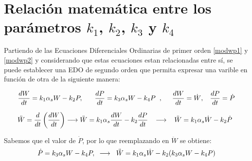 
\section{Relación matemática entre los parámetros $k_{1}$, $k_{2}$, $k_{3}$ y $k_{4}$}\label{demostralabel}

Partiendo de las Ecuaciones Diferenciales Ordinarias de primer orden \ref{modwp1} y \ref{modwp2} y considerando que estas ecuaciones estan relacionadas entre sí, se puede establecer una EDO de segundo orden que permita expresar una varible en función de otra de la siguiente manera:

\begin{equation*}
    \frac{dW}{dt} = k_{1}\alpha_{s}W - k_{2}P, \hspace{0.6cm} \frac{dP}{dt} = k_{3}\alpha_{s}W - k_{4}P \hspace{0.2cm}, \hspace{0.3cm} \hspace{0.2cm} \frac{dW}{dt} = \dot{W}, \hspace{0.3cm} \frac{dP}{dt} = \dot{P}
\end{equation*}


\begin{equation*}
    \ddot{W} = \frac{d}{dt}\left(\frac{dW}{dt}\right) \longrightarrow \ddot{W} = k_{1}\alpha_{s}\frac{dW}{dt} - k_{2}\frac{dP}{dt} \hspace{0.3cm} \longrightarrow \hspace{0.3cm} \ddot{W} = k_{1}\alpha_{s}\dot{W} - k_{2}\dot{P}\hspace{0.15cm}
\end{equation*}

Sabemos que el valor de $\dot{P}$, por lo que reemplazando en $\ddot{W}$ se obtiene:
\begin{equation*}
    \dot{P} = k_{3}\alpha_{s}W - k_{4}P, \hspace{0.2cm}\longrightarrow\hspace{0.2cm} \ddot{W} = k_{1}\alpha_{s}\dot{W} - k_{2}(k_{3}\alpha_{s}W - k_{4}P)
\end{equation*}

